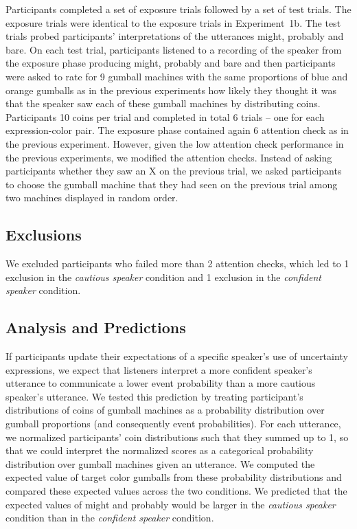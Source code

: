 \documentclass[lucida,biblatex]{sp} %
\begin{document}
Participants completed a set of exposure trials followed by a set of test trials. The exposure trials were identical to the exposure trials in Experiment~1b. The test trials probed participants' interpretations of the utterances {\sc might}, {\sc probably} and {\sc bare}. On each test trial, participants listened to a recording of the speaker from the exposure phase producing {\sc might}, {\sc probably} and {\sc bare} and then participants were asked to rate for 9 gumball machines with the same proportions of blue and orange gumballs as in the previous experiments how likely they thought it was that the speaker saw each of these gumball machines by distributing coins.  Participants 10 coins per trial and completed in total 6 trials -- one for each expression-color pair. The exposure phase contained again 6 attention check as in the previous experiment. However, given the low attention check performance in the previous experiments, we modified the attention checks. Instead of asking participants whether they saw an X on the previous trial, we asked participants to choose the gumball machine that they had seen on the previous trial among two machines displayed in random order.

\subsection{Exclusions}

We excluded participants who failed more than 2 attention checks, which led to 1 exclusion in the \emph{cautious speaker} condition and 1 exclusion in the \emph{confident speaker} condition.


\subsection{Analysis and Predictions}

If participants update their expectations of a specific speaker's use of uncertainty expressions,  we expect that listeners interpret a more confident speaker's utterance 
to communicate a lower event probability than a more cautious speaker's utterance. We tested this prediction by treating participant's distributions of coins 
of gumball machines as a probability distribution over gumball proportions (and consequently event probabilities).  For each utterance, we 
normalized participants' coin distributions such that they summed up to 1, so that we could interpret the normalized scores 
as a categorical probability distribution over gumball machines given an utterance. We computed the expected value of target color gumballs 
from these probability distributions and compared these expected values across the two conditions. We predicted that the expected values of {\sc might} and {\sc probably} would be larger in the \emph{cautious speaker} condition than in the \emph{confident speaker} condition.
\end{document}
